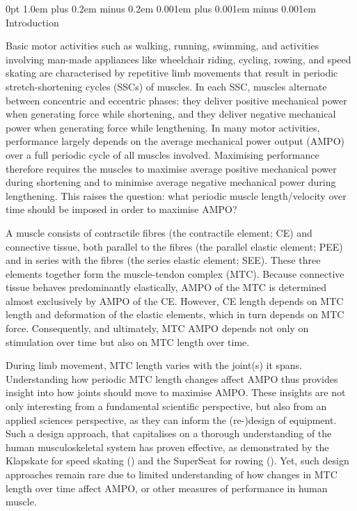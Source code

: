 \documentclass[
  11pt,
  a4paper]{article}
\makeatletter
\renewcommand{\section}{%
  \@startsection{section}{1}
    {0pt} 					%
    {1.0em plus 0.2em minus 0.2em} 	%
    {0.001em plus 0.001em minus 0.001em}    	%
    {\Large\bfseries\sffamily}%
}
\makeatother
\begin{document}
\section{Introduction}\label{introduction}

Basic motor activities such as walking, running, swimming, and
activities involving man-made appliances like wheelchair riding,
cycling, rowing, and speed skating are characterised by repetitive limb
movements that result in periodic stretch-shortening cycles (SSCs) of
muscles. In each SSC, muscles alternate between concentric and eccentric
phases: they deliver positive mechanical power when generating force
while shortening, and they deliver negative mechanical power when
generating force while lengthening. In many motor activities,
performance largely depends on the average mechanical power output
(AMPO) over a full periodic cycle of all muscles involved. Maximising
performance therefore requires the muscles to maximise average positive
mechanical power during shortening and to minimise average negative
mechanical power during lengthening. This raises the question: what
periodic muscle length/velocity over time should be imposed in order to
maximise AMPO?

A muscle consists of contractile fibres (the contractile element; CE)
and connective tissue, both parallel to the fibres (the parallel elastic
element; PEE) and in series with the fibres (the series elastic element;
SEE). These three elements together form the muscle-tendon complex
(MTC). Because connective tissue behaves predominantly elastically, AMPO
of the MTC is determined almost exclusively by AMPO of the CE. However,
CE length depends on MTC length and deformation of the elastic elements,
which in turn depends on MTC force. Consequently, and ultimately, MTC
AMPO depends not only on stimulation over time but also on MTC length
over time.

During limb movement, MTC length varies with the joint(s) it spans.
Understanding how periodic MTC length changes affect AMPO thus provides
insight into how joints should move to maximise AMPO. These insights are
not only interesting from a fundamental scientific perspective, but also
from an applied sciences perspective, as they can inform the (re-)design
of equipment. Such a design approach, that capitalises on a thorough
understanding of the human musculoskeletal system has proven effective,
as demonstrated by the Klapskate for speed skating
()
and the SuperSeat for rowing
().
Yet, such design approaches remain rare due to limited understanding of
how changes in MTC length over time affect AMPO, or other measures of
performance in human muscle.
\end{document}
